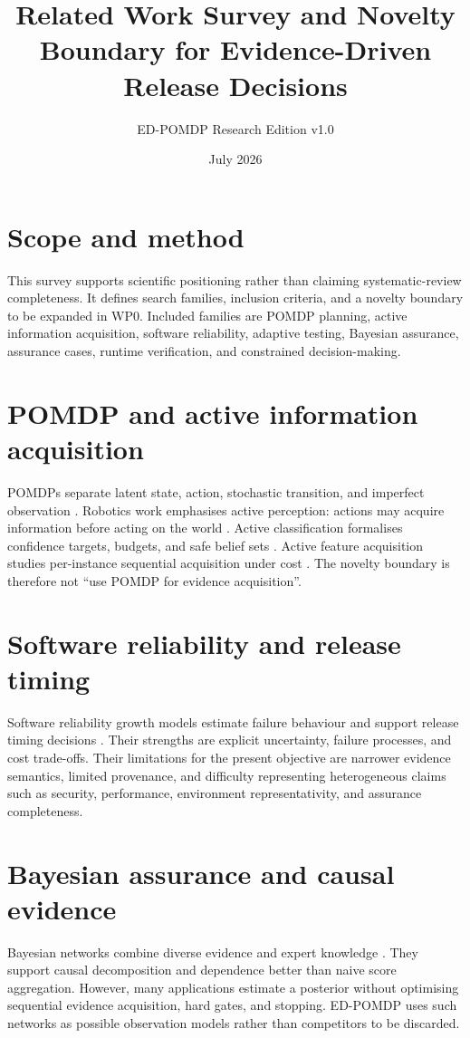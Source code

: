 \documentclass[11pt]{article}
\title{Related Work Survey and Novelty Boundary for Evidence-Driven Release Decisions}
\author{ED-POMDP Research Edition v1.0}
\date{July 2026}
\begin{document}
\maketitle\tableofcontents
\section{Scope and method}
This survey supports scientific positioning rather than claiming systematic-review completeness. It defines search families, inclusion criteria, and a novelty boundary to be expanded in WP0. Included families are POMDP planning, active information acquisition, software reliability, adaptive testing, Bayesian assurance, assurance cases, runtime verification, and constrained decision-making.

\section{POMDP and active information acquisition}
POMDPs separate latent state, action, stochastic transition, and imperfect observation \cite{kaelbling1998planning}. Robotics work emphasises active perception: actions may acquire information before acting on the world \cite{lauri2023robotics,arora2019multimodal}. Active classification formalises confidence targets, budgets, and safe belief sets \cite{wu2020active}. Active feature acquisition studies per-instance sequential acquisition under cost \cite{rahbar2025active}. The novelty boundary is therefore not ``use POMDP for evidence acquisition''.

\section{Software reliability and release timing}
Software reliability growth models estimate failure behaviour and support release timing decisions \cite{ieee1633,wong2024revisiting}. Their strengths are explicit uncertainty, failure processes, and cost trade-offs. Their limitations for the present objective are narrower evidence semantics, limited provenance, and difficulty representing heterogeneous claims such as security, performance, environment representativity, and assurance completeness.

\section{Bayesian assurance and causal evidence}
Bayesian networks combine diverse evidence and expert knowledge \cite{fenton2012risk}. They support causal decomposition and dependence better than naive score aggregation. However, many applications estimate a posterior without optimising sequential evidence acquisition, hard gates, and stopping. ED-POMDP uses such networks as possible observation models rather than competitors to be discarded.
\end{document}
